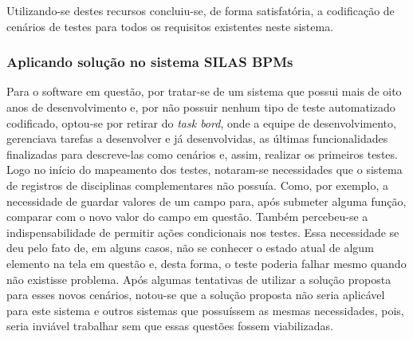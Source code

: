 \documentclass[tg]{mdtufsm}
\begin{document}
Utilizando-se destes recursos concluiu-se, de forma satisfatória, a codificação de cenários de testes para todos os requisitos existentes neste sistema.

\subsubsection{Aplicando solução no sistema SILAS BPMs}
Para o software em questão, por tratar-se de um sistema que possui mais de oito anos de desenvolvimento e, por não possuir nenhum tipo de teste automatizado codificado, optou-se por retirar do \emph{task bord}, onde a equipe de desenvolvimento, gerenciava tarefas a desenvolver e já desenvolvidas, as últimas funcionalidades finalizadas para descreve-las como cenários e, assim, realizar os primeiros testes.
Logo no início do mapeamento dos testes, notaram-se necessidades que o sistema de registros de disciplinas complementares não possuía. Como, por exemplo, a necessidade de guardar valores de um campo para, após submeter alguma função, comparar com o novo valor do campo em questão. Também percebeu-se a indispensabilidade de permitir ações condicionais nos testes. Essa necessidade se deu pelo fato de, em alguns casos, não se conhecer o estado atual de algum elemento na tela em questão e, desta forma, o teste poderia falhar mesmo quando não existisse problema.
Após algumas tentativas de utilizar a solução proposta para esses novos cenários, notou-se que a solução proposta não seria aplicável para este sistema e outros sistemas que possuíssem as mesmas necessidades, pois, seria inviável trabalhar sem que essas questões fossem viabilizadas.
\end{document}

